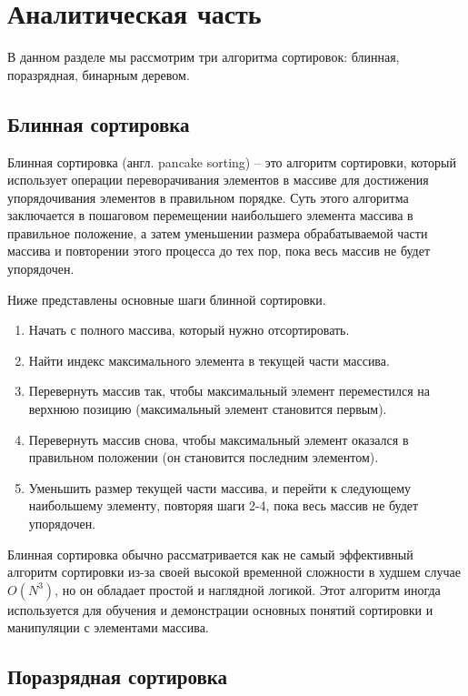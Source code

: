 \chapter{Аналитическая часть}
В данном разделе мы рассмотрим три алгоритма сортировок: блинная, поразрядная, бинарным деревом.

\section{Блинная сортировка}

Блинная сортировка (англ. pancake sorting) \cite{pancake-sort} -- это алгоритм сортировки, который использует операции переворачивания элементов в массиве для достижения упорядочивания элементов в правильном порядке. 
Суть этого алгоритма заключается в пошаговом перемещении наибольшего элемента массива в правильное положение, а затем уменьшении размера обрабатываемой части массива и повторении этого процесса до тех пор, пока весь массив не будет упорядочен.

Ниже представлены основные шаги блинной сортировки.
\begin{enumerate}
\item Начать с полного массива, который нужно отсортировать.
\item Найти индекс максимального элемента в текущей части массива.
\item Перевернуть массив так, чтобы максимальный элемент переместился на верхнюю позицию (максимальный элемент становится первым).
\item Перевернуть массив снова, чтобы максимальный элемент оказался в правильном положении (он становится последним элементом).
\item Уменьшить размер текущей части массива, и перейти к следующему наибольшему элементу, повторяя шаги 2-4, пока весь массив не будет упорядочен.
\end{enumerate}

Блинная сортировка обычно рассматривается как не самый эффективный алгоритм сортировки из-за своей высокой временной сложности в худшем случае $O(N^3)$, но он обладает простой и наглядной логикой. 
Этот алгоритм иногда используется для обучения и демонстрации основных понятий сортировки и манипуляции с элементами массива.

\section{Поразрядная сортировка}

